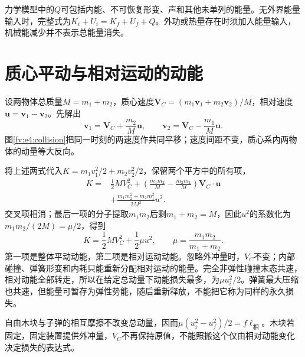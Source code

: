 力学模型中的$Q$可包括内能、不可恢复形变、声和其他未单列的能量。无外界能量输入时，完整式为$K_i+U_i=K_f+U_f+Q$。外功或热量存在时须加入能量输入，机械能减少并不表示总能量消失。

\section{质心平动与相对运动的动能}

设两物体总质量$M=m_1+m_2$，质心速度$\bm V_C=(m_1\bm v_1+m_2\bm v_2)/M$，相对速度$\bm u=\bm v_1-\bm v_2$。先解出
\[
 \bm v_1=\bm V_C+\frac{m_2}{M}\bm u,\qquad
 \bm v_2=\bm V_C-\frac{m_1}{M}\bm u.
\]
图\ref{fv:e4:collision}把同一时刻的两速度作共同平移；速度间距不变，质心系内两物体的动量等大反向。



将上述两式代入$K=m_1v_1^2/2+m_2v_2^2/2$，保留两个平方中的所有项，
\begin{align*}
K={}&\frac12MV_C^2
+\left(\frac{m_1m_2}{M}-\frac{m_2m_1}{M}\right)\bm V_C\cdot\bm u\\
&+\frac{m_1m_2^2+m_2m_1^2}{2M^2}u^2.
\end{align*}
交叉项相消；最后一项的分子提取$m_1m_2$后剩$m_1+m_2=M$，因此$u^2$的系数化为$m_1m_2/(2M)=\mu/2$，得到
\begin{equation}
 K=\frac12MV_C^2+\frac12\mu u^2,\qquad
 \mu=\frac{m_1m_2}{m_1+m_2}.
 \label{eq:em4:relative}
\end{equation}
第一项是整体平动动能，第二项是相对运动动能。忽略外冲量时，$V_C$不变；内部碰撞、弹簧形变和内耗只能重新分配相对运动的能量。完全非弹性碰撞末态共速，相对动能全部转走，所以在给定总动量下动能损失最多，为$\mu u_i^2/2$。弹簧最大压缩也共速，但能量可暂存为弹性势能，随后重新释放，不能把它称为同样的永久损失。


自由木块与子弹的相互摩擦不改变总动量，因而$\mu(u_i^2-u_f^2)/2=f\ell_{\text{相}}$。木块若固定，固定装置提供外冲量，$V_C$不再保持原值，不能照搬这个仅由相对动能变化决定损失的表达式。

